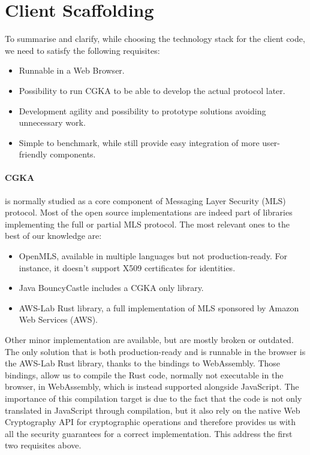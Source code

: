 \section{Client Scaffolding}
To summarise and clarify, while choosing the technology stack for the client code, we need to satisfy the following requisites:
\begin{itemize}
    \item Runnable in a Web Browser.
    \item Possibility to run CGKA to be able to develop the actual protocol later.
    \item Development agility and possibility to prototype solutions avoiding unnecessary work.
    \item Simple to benchmark, while still provide easy integration of more user-friendly components.
\end{itemize}

\paragraph{CGKA} is normally studied as a core component of Messaging Layer Security (MLS) protocol.
Most of the open source implementations are indeed part of libraries implementing the full or partial MLS protocol.
The most relevant ones to the best of our knowledge are:
\begin{itemize}
    \item OpenMLS, available in multiple languages but not production-ready. For instance, it doesn't support X509 certificates for identities.
    \item Java BouncyCastle includes a CGKA only library.
    \item AWS-Lab Rust library, a full implementation of MLS sponsored by Amazon Web Services (AWS). 
\end{itemize}

Other minor implementation are available, but are mostly broken or outdated.
The only solution that is both production-ready and is runnable in the browser is the AWS-Lab Rust library, thanks to the bindings to WebAssembly.
Those bindings, allow us to compile the Rust code, normally not executable in the browser, in WebAssembly, which is instead supported alongside JavaScript.
The importance of this compilation target is due to the fact that the code is not only translated in JavaScript through compilation, but it also rely on the native Web Cryptography API for cryptographic operations and therefore provides us with all the security guarantees for a correct implementation.
This address the first two requisites above.

